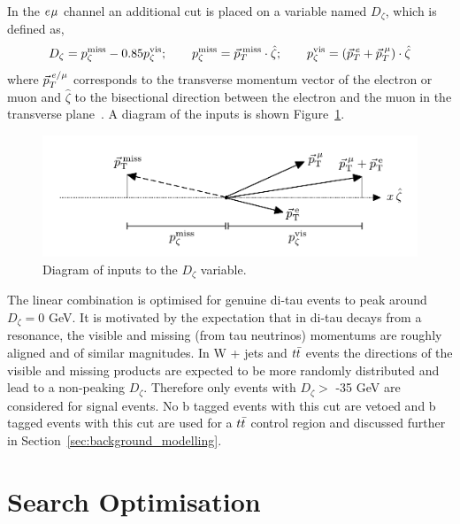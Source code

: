In the $e_{}\mu_{}$ channel an additional cut is placed on a variable named $D_{\zeta}$, which is defined as,
\begin{equation}
D_\zeta = p_\zeta^\text{miss} - 0.85 p_\zeta^\text{vis};\qquad
p_\zeta^\text{miss} = \vec{p}_{T}^{\hspace{2pt}\text{miss}} \cdot \hat{\zeta};\qquad
p_\zeta^\text{vis} = (\vec{p}_{T}^{\hspace{2pt}e} + \vec{p}_{T}^{\hspace{2pt}\mu}) \cdot \hat{\zeta}
\label{eqn:Dzeta_def}
\end{equation}
where $\vec{p}_{T}^{\hspace{2pt}e/\mu}$ corresponds to the transverse momentum vector of the electron or muon and $\hat{\zeta}$ to the bisectional direction between the electron and the muon in the transverse plane~\cite{CDFPzeta}.
A diagram of the inputs is shown Figure~\ref{fig:dzeta_diagram}. \\
\begin{figure}[!hbtp]
\centering
    \includegraphics[width=1.0\textwidth]{Figures/dzeta_diagram.pdf}
\caption{Diagram of inputs to the $D_\zeta$ variable.}
\label{fig:dzeta_diagram}
\end{figure}

The linear combination is optimised for genuine di-tau events to peak around $D_{\zeta} = 0$ GeV. 
It is motivated by the expectation that in di-tau decays from a resonance, the visible and missing (from tau neutrinos) momentums are roughly aligned and of similar magnitudes.
In W + jets and $t\bar{t}$ events the directions of the visible and missing products are expected to be more randomly distributed and lead to a non-peaking $D_{\zeta}$.
Therefore only events with $D_\zeta >$ -35 GeV are considered for signal events.
No b tagged events with this cut are vetoed and b tagged events with this cut are used for a $t\bar{t}$ control region and discussed further in Section~\ref{sec:background_modelling}.

\newpage
\section{Search Optimisation}
\label{sec:search_optimisation}

